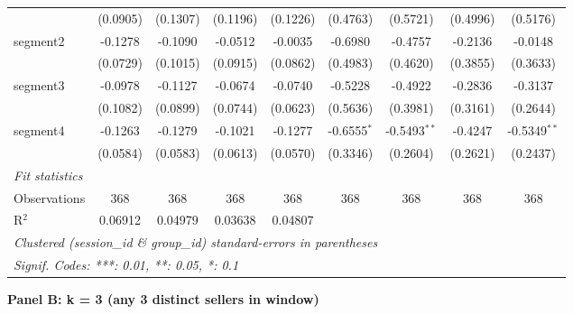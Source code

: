 \begin{tabular}{lcccccccc}
                          & (0.0905)       & (0.1307)       & (0.1196)       & (0.1226)       & (0.4763)        & (0.5721)       & (0.4996)      & (0.5176)\\   
   segment2               & -0.1278        & -0.1090        & -0.0512        & -0.0035        & -0.6980         & -0.4757        & -0.2136       & -0.0148\\   
                          & (0.0729)       & (0.1015)       & (0.0915)       & (0.0862)       & (0.4983)        & (0.4620)       & (0.3855)      & (0.3633)\\   
   segment3               & -0.0978        & -0.1127        & -0.0674        & -0.0740        & -0.5228         & -0.4922        & -0.2836       & -0.3137\\   
                          & (0.1082)       & (0.0899)       & (0.0744)       & (0.0623)       & (0.5636)        & (0.3981)       & (0.3161)      & (0.2644)\\   
   segment4               & -0.1263        & -0.1279        & -0.1021        & -0.1277        & -0.6555$^{*}$   & -0.5493$^{**}$ & -0.4247       & -0.5349$^{**}$\\   
                          & (0.0584)       & (0.0583)       & (0.0613)       & (0.0570)       & (0.3346)        & (0.2604)       & (0.2621)      & (0.2437)\\   
   \midrule
   \emph{Fit statistics}\\
   Observations           & 368            & 368            & 368            & 368            & 368             & 368            & 368           & 368\\  
   R$^2$                  & 0.06912        & 0.04979        & 0.03638        & 0.04807        &                 &                &               & \\  
   \midrule \midrule
   \multicolumn{9}{l}{\emph{Clustered (session\_id \& group\_id) standard-errors in parentheses}}\\
   \multicolumn{9}{l}{\emph{Signif. Codes: ***: 0.01, **: 0.05, *: 0.1}}\\
\end{tabular}
\par\endgroup
\medskip
\textbf{Panel B: k = 3 (any 3 distinct sellers in window)}\\
\begingroup
\centering
\scriptsize
